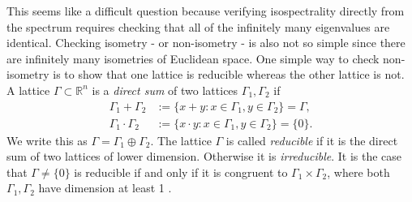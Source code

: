 \documentclass{amsart}
\theoremstyle{definition}
\newcommand*{\R}{\mathbb{R}}
\begin{document}

This seems like a difficult question because verifying isospectrality directly from the spectrum requires checking that all of the infinitely many eigenvalues are identical.  Checking isometry - or non-isometry - is also not so simple since there are infinitely many isometries of Euclidean space.  One simple way to check non-isometry is to show that one lattice is reducible whereas the other lattice is not.  A lattice $\Gamma \subset \R^n$ is a \textit{direct sum} of two lattices $\Gamma_1, \Gamma_2$ if 
\begin{align*}
    \Gamma_1 + \Gamma_2 &:= \{x + y : x \in \Gamma_1, y \in \Gamma_2\} = \Gamma, \\
    \Gamma_1 \cdot \Gamma_2 &:= \{x \cdot y : x \in \Gamma_1, y \in \Gamma_2\} = \{0\}.
\end{align*}
We write this as $\Gamma = \Gamma_1 \oplus \Gamma_2$. The lattice $\Gamma$ is called \textit{reducible} if it is the direct sum of two lattices of lower dimension. Otherwise it is \textit{irreducible}. It is the case that $\Gamma \neq \{0\}$ is reducible if and only if it is congruent to $\Gamma_1 \times \Gamma_2$, where both $\Gamma_1,\Gamma_2$ have dimension at least 1 \cite[Lemma 2.26]
{nilsson2022isospectral}. 
\end{document}
